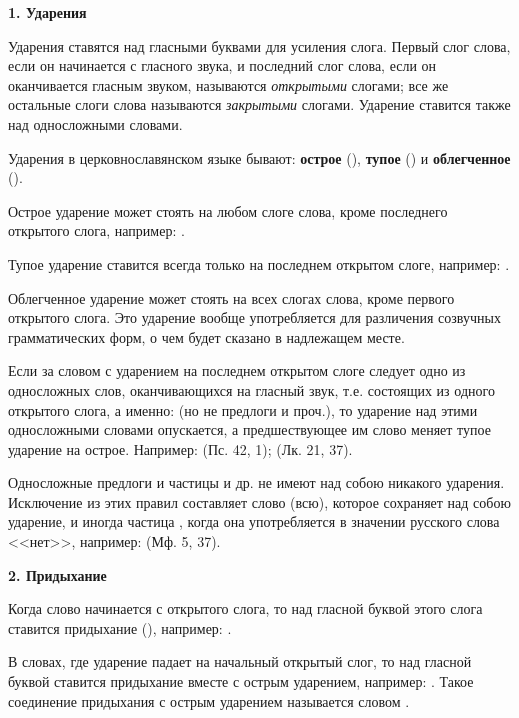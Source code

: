 \documentclass[11pt,a4paper,oneside]{memoir}
\begin{document}
    \textbf{1. Ударения}    
    \medskip

    Ударения ставятся над гласными буквами для усиления слога. Первый слог слова, если он начинается с гласного звука, и последний слог слова, если он оканчивается гласным звуком, называются \emph{открытыми} слогами; все же остальные слоги слова называются \emph{закрытыми} слогами. Ударение ставится также над односложными словами.
    
    Ударения в церковнославянском языке бывают: \textbf{острое} ({}), \textbf{тупое} ({}) и \textbf{облегченное} ({}).
    
    Острое ударение может стоять на любом слоге слова, кроме последнего открытого слога, например: {}.
    
    Тупое ударение ставится всегда только на последнем открытом слоге, например: {}.
    
    Облегченное ударение может стоять на всех слогах слова, кроме первого открытого слога. Это ударение вообще употребляется для различения созвучных грамматических форм, о чем будет сказано в надлежащем месте.
    
    Если за словом с ударением на последнем открытом слоге следует одно из односложных слов, оканчивающихся на гласный звук, т.е. состоящих из одного открытого слога, а именно: {} (но не предлоги {} и проч.), то ударение над этими односложными словами опускается, а предшествующее им слово меняет тупое ударение на острое. Например: {} (Пс. 42, 1); {} (Лк. 21, 37).
    
    Односложные предлоги и частицы {} и др. не имеют над собою никакого ударения. Исключение из этих правил составляет слово {} (всю), которое сохраняет над собою ударение, и иногда частица {}, когда она употребляется в значении русского слова <<нет>>, например: {} (Мф. 5, 37).
    
    \medskip
    \textbf{2. Придыхание}
    \medskip
    
    Когда слово начинается с открытого слога, то над гласной буквой этого слога ставится придыхание ({}), например: {}.
    
    В словах, где ударение падает на начальный открытый слог, то над гласной буквой ставится придыхание вместе с острым ударением, например: {}. Такое соединение придыхания с острым ударением называется словом {}.
    
\end{document}
